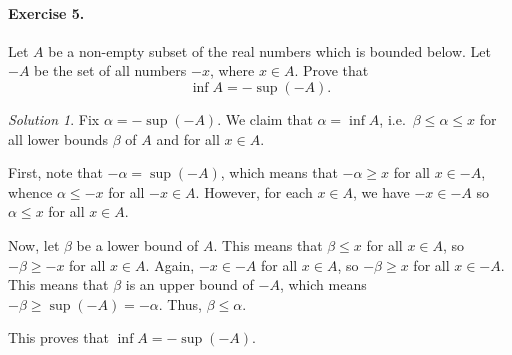 \documentclass[11pt]{report}
\theoremstyle{remark}
\newtheorem*{solution}{Solution}
\begin{document}
    \paragraph{Exercise 5.} Let $A$ be a non-empty subset of the real numbers which
    is bounded below. Let $-A$ be the set of all numbers $-x$, where $x \in A$.
    Prove that \[
        \inf A = - \sup(-A).
    \] 
    \begin{solution}
        Fix $\alpha = -\sup(-A)$. We claim that $\alpha = \inf A$, i.e.\ $\beta \leq
        \alpha \leq x$ for all lower bounds $\beta$ of $A$ and for all $x \in A$.

        First, note that $-\alpha = \sup(-A)$, which means that $-\alpha \geq x$ for
        all $x \in -A$, whence $\alpha \leq -x$ for all $-x \in A$. However, for
        each $x \in A$, we have $-x \in -A$ so $\alpha \leq x$ for all $x \in A$.

        Now, let $\beta$ be a lower bound of $A$. This means that $\beta \leq x$ for
        all $x \in A$, so $-\beta \geq -x$ for all $x \in A$. Again, $-x \in -A$ for
        all $x \in A$, so $-\beta \geq x$ for all $x \in -A$. This means that
        $\beta$ is an upper bound of $-A$, which means $-\beta \geq \sup(-A) =
        -\alpha$. Thus, $\beta \leq \alpha$.

        This proves that $\inf A = -\sup(-A)$.
    \end{solution}
\end{document}
